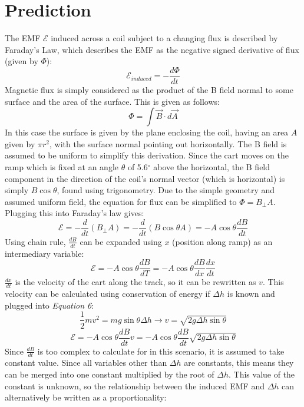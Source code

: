 \documentclass[12pt,letterpaper]{article}
\begin{document}
\section*{Prediction}
The EMF $\mathcal{E}$ induced across a coil subject to a changing flux is described by Faraday's Law, which describes the EMF as the negative signed derivative of flux (given by $\Phi$):
\begin{equation}
\mathcal{E}_{induced}=-\frac{d\Phi}{dt}
\end{equation}
Magnetic flux is simply considered as the product of the B field normal to some surface and the area of the surface. This is given as follows:
\begin{equation}
\Phi = \int \vec{B}\cdot d \vec{A}
\end{equation}
In this case the surface is given by the plane enclosing the coil, having an area $A$ given by $\pi r^2$, with the surface normal pointing out horizontally. The B field is assumed to be uniform to simplify this derivation. Since the cart moves on the ramp which is fixed at an angle $\theta $ of 5.6$^\circ$ above the horizontal, the B field component in the direction of the coil's normal vector (which is horizontal) is simply $B\cos \theta$, found using trigonometry. Due to the simple geometry and assumed uniform field, the equation for flux can be simplified to $\Phi = B_\perp A$. Plugging this into Faraday's law gives:
\begin{equation}
\mathcal{E} = -\frac{d}{dt}(B_\perp A) = -\frac{d}{dt}(B \cos \theta A) = -A \cos \theta \frac{dB}{dt}
\end{equation} 
Using chain rule, $\frac{dB}{dt}$ can be expanded using $x$ (position along ramp) as an intermediary variable:
\begin{equation}
\mathcal{E}=-A\cos \theta \frac{dB}{dT} = -A \cos\theta \frac{dB}{dx}\frac{dx}{dt}
\end{equation}
$\frac{dx}{dt}$ is the velocity of the cart along the track, so it can be rewritten as $v$. This velocity can be calculated using conservation of energy if $\Delta h$ is known and plugged into \textit{Equation 6}:
\begin{equation}
\frac{1}{2}mv^2=mg\sin\theta\Delta h \longrightarrow v=\sqrt{2g\Delta h\sin\theta}
\end{equation}
\begin{equation}
\mathcal{E}=-A\cos\theta\frac{dB}{dt}v=-A\cos\theta\frac{dB}{dt}\sqrt{2g\Delta h\sin\theta}
\end{equation}
Since $\frac{dB}{dt}$ is too complex to calculate for in this scenario, it is assumed to take constant value. Since all variables other than $\Delta h$ are constants, this means they can be merged into one constant multiplied by the root of $\Delta h$. This value of the constant is unknown, so the relationship between the induced EMF and $\Delta h$ can alternatively be written as a proportionality:
\end{document}
